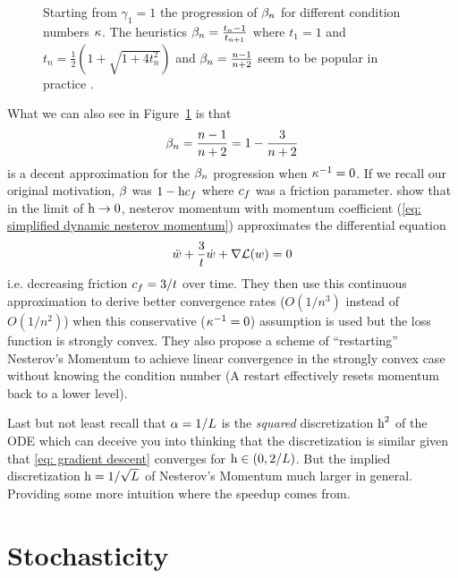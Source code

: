 \begin{figure}[h]
	\centering
	\def\svgwidth{1\textwidth}
	
	\caption{
		Starting from \(\gamma_1=1\) the progression of \(\beta_n\) for
		different condition numbers \(\kappa\). The heuristics
		\(\beta_n=\frac{t_n-1}{t_{n+1}}\) where \(t_1=1\) and
		\(t_n=\tfrac12(1+\sqrt{1+4t_n^2})\) and \(\beta_n=\frac{n-1}{n+2}\)
		seem to be popular in practice \parencite{rechtOptimization2013}.
	}
	\label{fig: momentum progression}
\end{figure}

What we can also see in Figure~\ref{fig: momentum progression} is that
\begin{align}\label{eq: simplified dynamic nesterov momentum}
	\beta_n = \frac{n-1}{n+2} = 1-\frac{3}{n+2}
\end{align}
is a decent approximation for the \(\beta_n\) progression when \(\kappa^{-1}=0\).
If we recall our original motivation, \(\beta\) was \(1-\text{h}c_f\) where
\(c_f\) was a friction parameter. \textcite{suDifferentialEquationModeling2015}
show that in the limit of \(\text{h}\to0\), nesterov momentum with momentum
coefficient (\ref{eq: simplified dynamic nesterov momentum}) approximates the
differential equation
\begin{align*}
	\ddot{w} + \frac{3}{t}\dot{w} + \nabla\mathcal{L}(w) = 0
\end{align*}
i.e. decreasing friction \(c_f=3/t\) over time. They then use this
continuous approximation to derive better convergence rates (\(O(1/n^3)\) instead of
\(O(1/n^2)\)) when this conservative (\(\kappa^{-1}=0\)) assumption is used
but the loss function is strongly convex. They also propose a scheme of
``restarting'' Nesterov's Momentum to achieve linear convergence in the
strongly convex case without knowing the condition number (A restart effectively
resets momentum back to a lower level).

Last but not least recall that \(\alpha=1/L\) is the \emph{squared}
discretization \(\text{h}^2\) of the ODE which can deceive you into thinking that the
discretization is similar given that \ref{eq: gradient descent} converges for \(\text{h} \in
(0,2/L)\). But the implied discretization \(\text{h}=1/\sqrt{L}\) of
Nesterov's Momentum much larger in general. Providing some more intuition where the
speedup comes from.


\section{Stochasticity}


